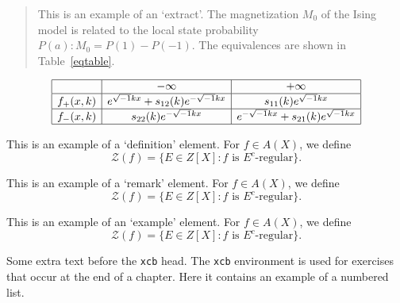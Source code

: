 \begin{quotation}
This is an example of an `extract'. The magnetization $M_0$ of the Ising
model is related to the local state probability $P(a):M_0=P(1)-P(-1)$.
The equivalences are shown in Table~\ref{eqtable}.
\end{quotation}

\begin{table}[ht]
\caption{}\label{eqtable}
\renewcommand\arraystretch{1.5}
\noindent\[
\begin{array}{|c|c|c|}
\hline
&{-\infty}&{+\infty}\\
\hline
{f_+(x,k)}&e^{\sqrt{-1}kx}+s_{12}(k)e^{-\sqrt{-1}kx}&s_{11}(k)e^
{\sqrt{-1}kx}\\
\hline
{f_-(x,k)}&s_{22}(k)e^{-\sqrt{-1}kx}&e^{-\sqrt{-1}kx}+s_{21}(k)e^{\sqrt
{-1}kx}\\
\hline
\end{array}
\]
\end{table}

\begin{definition}
This is an example of a `definition' element.
For $f\in A(X)$, we define
\begin{equation}
\mathcal{Z} (f)=\{E\in Z[X]: \text{$f$ is $E^c$-regular}\}.
\end{equation}
\end{definition}

\begin{remark}
This is an example of a `remark' element.
For $f\in A(X)$, we define
\begin{equation}
\mathcal{Z} (f)=\{E\in Z[X]: \text{$f$ is $E^c$-regular}\}.
\end{equation}
\end{remark}

\begin{example}
This is an example of an `example' element.
For $f\in A(X)$, we define
\begin{equation}
\mathcal{Z} (f)=\{E\in Z[X]: \text{$f$ is $E^c$-regular}\}.
\end{equation}
\end{example}


Some extra text before the \texttt{xcb} head. The \texttt{xcb} environment
is used for exercises that occur at the end of a chapter.  Here it contains
an example of a numbered list.

